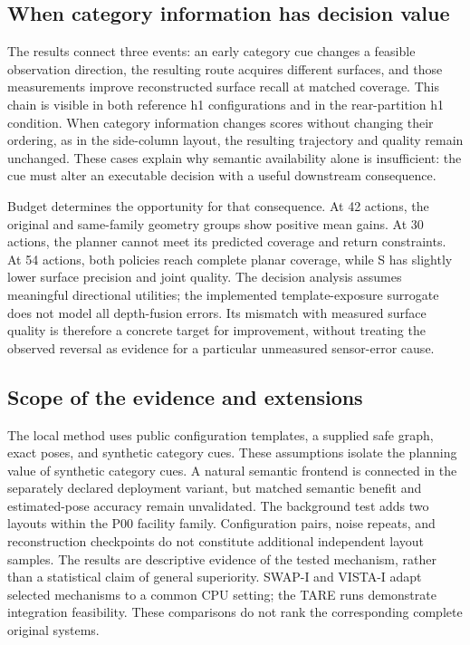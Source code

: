 \documentclass[11pt,a4paper]{article}
\providecommand{\hypertarget}[2]{#2}
\begin{document}
\hypertarget{when-category-information-has-decision-value}{%
\subsection{When category information has decision value}\label{when-category-information-has-decision-value}}

The results connect three events: an early category cue changes a feasible observation direction, the resulting route acquires different surfaces, and those measurements improve reconstructed surface recall at matched coverage. This chain is visible in both reference h1 configurations and in the rear-partition h1 condition. When category information changes scores without changing their ordering, as in the side-column layout, the resulting trajectory and quality remain unchanged. These cases explain why semantic availability alone is insufficient: the cue must alter an executable decision with a useful downstream consequence.

Budget determines the opportunity for that consequence. At 42 actions, the original and same-family geometry groups show positive mean gains. At 30 actions, the planner cannot meet its predicted coverage and return constraints. At 54 actions, both policies reach complete planar coverage, while S has slightly lower surface precision and joint quality. The decision analysis assumes meaningful directional utilities; the implemented template-exposure surrogate does not model all depth-fusion errors. Its mismatch with measured surface quality is therefore a concrete target for improvement, without treating the observed reversal as evidence for a particular unmeasured sensor-error cause.

\hypertarget{scope-of-the-evidence-and-extensions}{%
\subsection{Scope of the evidence and extensions}\label{scope-of-the-evidence-and-extensions}}

The local method uses public configuration templates, a supplied safe graph, exact poses, and synthetic category cues. These assumptions isolate the planning value of synthetic category cues. A natural semantic frontend is connected in the separately declared deployment variant, but matched semantic benefit and estimated-pose accuracy remain unvalidated. The background test adds two layouts within the P00 facility family. Configuration pairs, noise repeats, and reconstruction checkpoints do not constitute additional independent layout samples. The results are descriptive evidence of the tested mechanism, rather than a statistical claim of general superiority. SWAP-I and VISTA-I adapt selected mechanisms to a common CPU setting; the TARE runs demonstrate integration feasibility. These comparisons do not rank the corresponding complete original systems.
\end{document}
